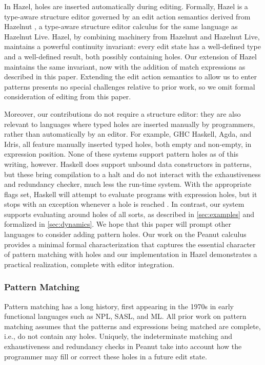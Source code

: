 In Hazel, holes are inserted automatically during editing. Formally, Hazel is a type-aware structure editor governed by an edit action semantics derived from Hazelnut \cite{DBLP:conf/popl/OmarVHAH17}, a type-aware structure editor calculus 
for the same language as Hazelnut Live. 
Hazel, by combining machinery from Hazelnut and Hazelnut Live, maintains a powerful continuity invariant: every edit state has a well-defined type
and a well-defined result, both possibly containing holes.
Our extension of Hazel maintains the same invariant, now with the addition of match expressions 
as described in this paper. 
Extending the edit action semantics to allow us to enter patterns presents no special challenges relative to prior work, so we omit formal consideration of editing from this paper.

Moreover, our contributions do not require a structure editor: they are also relevant to languages where typed holes are inserted 
manually by programmers, rather than automatically by an editor. 
For example, GHC Haskell, Agda, and Idris, all feature manually inserted typed holes, both empty and non-empty, in expression position. 
None of these systems support pattern holes as of this writing, however. Haskell does support unbound data constructors in patterns, but these bring compilation to a halt and do not interact with the exhaustiveness and redundancy checker, much less the run-time system. With the appropriate flags set, Haskell will attempt to evaluate programs with expression holes, but it stops with an exception whenever a hole is reached \cite{GHCHoles}. In contrast, our system supports evaluating around holes of all sorts, as described in \autoref{sec:examples} and formalized in \autoref{sec:dynamics}. We hope that this paper will prompt other languages to 
consider adding pattern holes. Our work on the Peanut calculus provides a minimal formal characterization 
that captures the essential character of pattern matching with holes and our implementation in Hazel 
demonstrates a practical realization, complete with editor integration.

\subsubsection{Pattern Matching}
Pattern matching has a long history, first appearing in the 1970s in early functional languages
such as NPL, SASL, and ML.
All prior work on pattern matching assumes that the patterns and expressions being matched are
complete, i.e., do not contain any holes.
Uniquely, the indeterminate matching and exhaustiveness and redundancy checks in Peanut
take into account how the programmer may fill or correct these holes in a future edit state.

